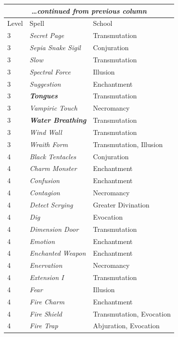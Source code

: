\begin{multicols}{2}
\noindent
\begin{tabular}{|p{}|p{}|p{}|}
\multicolumn{3}{c}{\textit{\ldots continued from previous column}} \\
\hline
Level	& Spell	& School \\
\hline\hline
\rowcolor[gray]{.9}3	& \textit{Secret Page}	& Transmutation \\
3	& \textit{Sepia Snake Sigil}	& Conjuration \\
\rowcolor[gray]{.9}3	& \textit{Slow}	& Transmutation \\
3	& \textit{Spectral Force}	& Illusion \\
\rowcolor[gray]{.9}3	& \textit{Suggestion}	& Enchantment \\
3	& \textit{\textbf{Tongues}}	& Transmutation \\
\rowcolor[gray]{.9}3	& \textit{Vampiric Touch}	& Necromancy \\
3	& \textit{\textbf{Water Breathing}}	& Transmutation \\
\rowcolor[gray]{.9}3	& \textit{Wind Wall}	& Transmutation \\
3	& \textit{Wraith Form}	& Transmutation, Illusion \\
\rowcolor[gray]{.9}4	& \textit{Black Tentacles}	& Conjuration \\
4	& \textit{Charm Monster}	& Enchantment \\
\rowcolor[gray]{.9}4	& \textit{Confusion}	& Enchantment \\
4	& \textit{Contagion}	& Necromancy \\
\rowcolor[gray]{.9}4	& \textit{Detect Scrying}	& Greater Divination \\
4	& \textit{Dig}	& Evocation \\
\rowcolor[gray]{.9}4	& \textit{Dimension Door}	& Transmutation \\
4	& \textit{Emotion}	& Enchantment \\
\rowcolor[gray]{.9}4	& \textit{Enchanted Weapon}	& Enchantment \\
4	& \textit{Enervation}	& Necromancy \\
\rowcolor[gray]{.9}4	& \textit{Extension I}	& Transmutation \\
4	& \textit{Fear}	& Illusion \\
\rowcolor[gray]{.9}4	& \textit{Fire Charm}	& Enchantment \\
4	& \textit{Fire Shield}	& Transmutation, Evocation \\
\rowcolor[gray]{.9}4	& \textit{Fire Trap}	& Abjuration, Evocation \\

\end{tabular}
\end{multicols}
